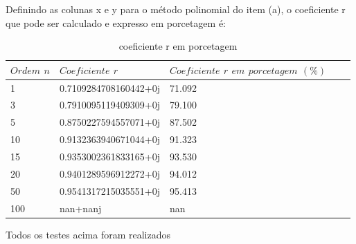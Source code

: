 \documentclass{article}
\begin{document}
\text Definindo as colunas x e y para o método polinomial do item (a), o coeficiente r que pode ser calculado e expresso em porcetagem é:
\begin{table}[h]
\centering
  \begin{tabular}{l|l|lll}
    $Ordem$ $n$ & $Coeficiente$ $r$ & $Coeficiente$ $r$ $em$ $porcetagem$ $(\%)$\\
    \hline
    1 & 0.7109284708160442+0j & 71.092\\
    
    3 & 0.7910095119409309+0j & 79.100\\
    
    5 & 0.8750227594557071+0j & 87.502 \\
    
    10 & 0.9132363940671044+0j & 91.323\\
    
    15 & 0.9353002361833165+0j  & 93.530\\
    
    20 & 0.9401289596912272+0j & 94.012\\
    
    50 & 0.9541317215035551+0j & 95.413\\
    
    100 & nan+nanj & nan\\
    \hline
  \end{tabular}
  \caption{coeficiente r em porcetagem}
\end{table}

\text Todos os testes acima foram realizados 
\end{document}

